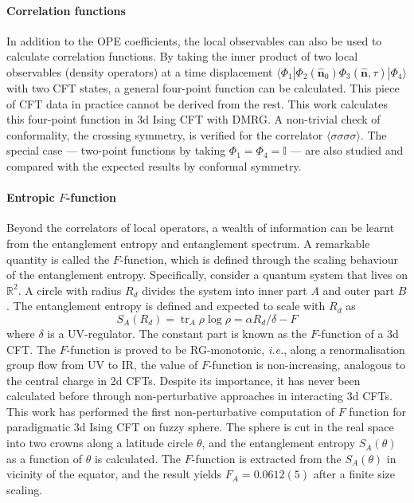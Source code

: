 \documentclass{timesjhep}
\begin{document}
\paragraph{Correlation functions~\cite{Han2023Jun}}

In addition to the OPE coefficients, the local observables can also be used to calculate correlation functions. By taking the inner product of two local observables (density operators) at a time displacement $\langle\Phi_1|\Phi_2(\hat{\mathbf{n}}_0)\Phi_3(\hat{\mathbf{n}},\tau)|\Phi_4\rangle$ with two CFT states, a general four-point function can be calculated. This piece of CFT data in practice cannot be derived from the rest. This work calculates this four-point function in 3d Ising CFT with DMRG. A non-trivial check of conformality, the crossing symmetry, is verified for the correlator $\langle\sigma\sigma\sigma\sigma\rangle$. The special case --- two-point functions by taking $\Phi_1=\Phi_4=\mathbb{I}$ --- are also studied and compared with the expected results by conformal symmetry. 

\paragraph{Entropic $F$-function~\cite{Hu2024}}

Beyond the correlators of local operators, a wealth of information can be learnt from the entanglement entropy and entanglement spectrum. A remarkable quantity is called the $F$-function, which is defined through the scaling behaviour of the entanglement entropy. Specifically, consider a quantum system that lives on $\mathbb{R}^2$. A circle with radius $R_d$ divides the system into inner part $A$ and outer part $B$. The entanglement entropy is defined and expected to scale with $R_d$ as \begin{equation}
    S_A(R_d)=\operatorname{tr}_A\rho\log\rho=\alpha R_d/\delta-F 
\end{equation}
where $\delta$ is a UV-regulator. The constant part is known as the $F$-function of a 3d CFT. The $F$-function is proved to be RG-monotonic, \textit{i.e.}, along a renormalisation group flow from UV to IR, the value of $F$-function is non-increasing, analogous to the central charge in 2d CFTs. Despite its importance, it has never been calculated before through non-perturbative approaches in interacting 3d CFTs. This work has performed the first non-perturbative computation of $F$ function for paradigmatic 3d Ising CFT on fuzzy sphere. The sphere is cut in the real space into two crowns along a latitude circle $\theta$, and the entanglement entropy $S_A(\theta)$ as a function of $\theta$ is calculated. The $F$-function is extracted from the $S_A(\theta)$ in vicinity of the equator, and the result yields $F_A=0.0612(5)$ after a finite size scaling. 
\end{document}
